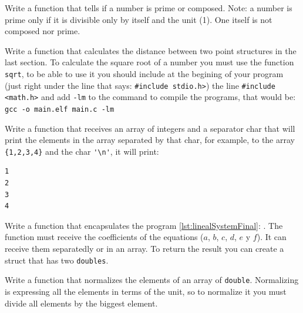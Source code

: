 \documentclass[a4paper]{article}
\begin{document}
\begin{exercises}[resume*]
\item Write a function that tells if a number is prime or composed. Note: a
number is prime only if it is divisible only by itself and the unit (1). One
itself is not composed nor prime.

\item Write a function that calculates the distance between two point structures
in the last section. To calculate the square root of a number you must use
the function \verb!sqrt!, to be able to use it you should include at the
begining of your program (just right under the line that says:
\verb!#include stdio.h>!) the line \verb!#include <math.h>! and add \verb!-lm!
to the command to compile the programs, that would be:
\verb!gcc -o main.elf main.c -lm!
\item Write a function that receives an array of integers and a separator char
that will print the elements in the array separated by that char, for example,
to the array \verb!{1,2,3,4}! and the char \verb!'\n'!, it will print:

\begin{minipage}[H]{\linewidth}
\mbox{}
\begin{verbatim}
1
2
3
4
\end{verbatim}
\end{minipage}

\item Write a function that encapsulates the program
\ref{lst:linealSystemFinal}: . The function must
receive the coefficients of the equations ($a$, $b$, $c$, $d$, $e$ y $f$). It
can receive them separatedly or in an array. To return the result you can create
a struct that has two \verb"doubles".
\item Write a function that normalizes the elements of an array of
\verb!double!. Normalizing is expressing all the elements in terms of the unit,
so to normalize it you must divide all elements by the biggest element.
\end{exercises}
\end{document}
